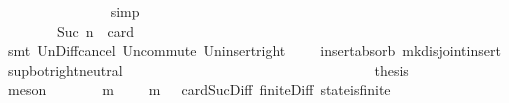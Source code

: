 \begin{isabellebody}
\ \ \ \ \ \ \ \ \ \ \ \ \ \ \isamarkupfalse%
\ simp\isanewline
\ \ \ \ \ \ \ \ \ \ \ \ \isamarkupfalse%
\ \isamarkupfalse%
\ {\isachardoublequoteopen}{\isasymsigma}\ {\isasymunion}\ {\isasymsigma}{\isacharprime}\ {\isasymin}\ {\isasymSigma}{\isachardoublequoteclose}\isanewline
\ \ \ \ \ \ \ \ \ \ \ \ \ \ \isamarkupfalse%
\ {\isacartoucheopen}{\isasymforall}{\isasymsigma}{\isasymin}{\isasymSigma}{\isachardot}\ {\isasymforall}{\isasymsigma}{\isacharprime}{\isasymin}{\isasymSigma}{\isachardot}\ {\isasymnot}\ {\isasymsigma}\ {\isasymsubseteq}\ {\isasymsigma}{\isacharprime}\ {\isasymand}\ Suc\ n\ {\isacharequal}\ card\ {\isacharparenleft}{\isasymsigma}\ {\isacharminus}\ {\isasymsigma}{\isacharprime}{\isacharparenright}\ {\isasymlongrightarrow}\ {\isasymsigma}\ {\isasymunion}\ {\isasymsigma}{\isacharprime}\ {\isasymin}\ {\isasymSigma}{\isacartoucheclose}\isanewline
\ \ \ \ \ \ \ \ \ \ \ \ \ \ \isamarkupfalse%
\ {\isacharparenleft}smt\ Un{\isacharunderscore}Diff{\isacharunderscore}cancel\ Un{\isacharunderscore}commute\ Un{\isacharunderscore}insert{\isacharunderscore}right\ \ {\isacartoucheopen}{\isasymsigma}\ {\isasymin}\ {\isasymSigma}{\isacartoucheclose}\ insert{\isacharunderscore}absorb{}\ mk{\isacharunderscore}disjoint{\isacharunderscore}insert\ sup{\isacharunderscore}bot{\isachardot}right{\isacharunderscore}neutral{\isacharparenright}\isanewline
\ \ \ \ \ \ \ \ \ \ \isamarkupfalse%
\isanewline
\ \ \ \ \ \ \ \ \isamarkupfalse%
\isanewline
\ \ \ \ \ \ \isamarkupfalse%
\isanewline
\ \ \ \ \ \ \isamarkupfalse%
\ \isamarkupfalse%
\ {\isacharquery}thesis\isanewline
\ \ \ \ \ \ \ \ \isamarkupfalse%
\ {\isacharparenleft}meson\ {\isacartoucheopen}{\isasymforall}{\isasymsigma}{\isasymin}{\isasymSigma}{\isachardot}\ {\isasymforall}{\isasymsigma}{\isacharprime}{\isasymin}{\isasymSigma}{\isachardot}\ {\isasymnot}\ {\isasymsigma}\ {\isasymsubseteq}\ {\isasymsigma}{\isacharprime}\ {\isasymlongrightarrow}\ {\isacharparenleft}{\isasymexists}m{\isasymin}{\isasymsigma}\ {\isacharminus}\ {\isasymsigma}{\isacharprime}{\isachardot}\ {\isasymsigma}{\isacharprime}\ {\isasymunion}\ {\isacharbraceleft}m{\isacharbraceright}\ {\isasymin}\ {\isasymSigma}{\isacharparenright}{\isacartoucheclose}\ card{\isacharunderscore}Suc{\isacharunderscore}Diff{}\ finite{\isacharunderscore}Diff\ state{\isacharunderscore}is{\isacharunderscore}finite{\isacharparenright}\isanewline
\ \ \ \ \isamarkupfalse%

\end{isabellebody}
